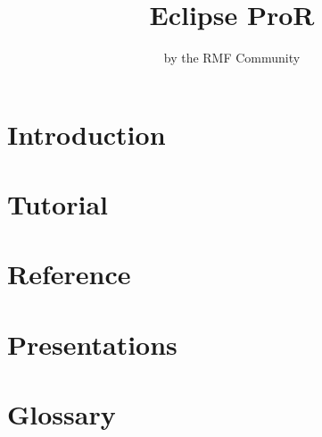 \documentclass[twoside,10pt]{book}
\title{Eclipse ProR}
\author{by the RMF Community}
\begin{document}
        

\maketitle

\chapter{Introduction}


\chapter{Tutorial}


\chapter{Reference}


\chapter{Presentations}


\chapter{Glossary}

\end{document}
